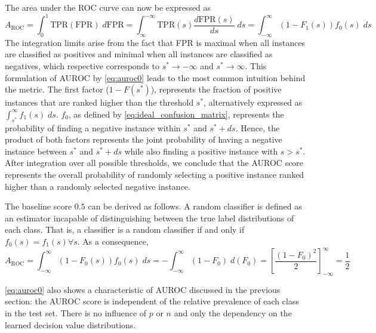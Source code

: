The area under the ROC curve can now be expressed as
%
\begin{equation}
    A_\text{ROC}
    = \int_{0}^{1} \text{TPR}(\text{FPR}) \;d\text{FPR}
    = \int_{\infty}^{-\infty} \text{TPR}(s) \frac{d\text{FPR}(s)}{ds} \;ds
    = \int_{-\infty}^{\infty} (1 - F_1(s)) f_0(s) \;ds
    \label{eq:auroc0}
\end{equation}
%
The integration limits arise from the fact that FPR is maximal when all instances are classified as positives
and minimal when all instances are classified as negatives, which respective corresponds to $s^* \to -\infty$ and $s^* \to \infty$. This formulation of AUROC by \autoref{eq:auroc0} leads to the most common intuition behind the metric.
%
The first factor ($1- F(s^*)$), represents the fraction of positive instances that are ranked higher than the threshold $s^*$, alternatively expressed as $\int_{s^*}^{\infty}f_1(s)\; ds$. $f_0$, as defined by \autoref{eq:ideal_confusion_matrix}, represents the probability of finding a negative instance within $s^*$ and $s^* + ds$. Hence, the product of both factors represents the joint probability of having a negative instance between $s^*$ and $s^* + ds$ while also finding a positive instance with $s > s^\ast$. 
%
After integration over all possible thresholds, we conclude that the AUROC score represents the overall probability of randomly selecting a positive instance ranked higher than a randomly selected negative instance.

The baseline score $0.5$ can be derived as follows. A random classifier is defined as an estimator incapable of distinguishing between the true label distributions of each class. That is, a classifier is a random classifier if and only if $f_0(s) = f_1(s) \forall s$. As a consequence,
%
\begin{equation}
    A_\text{ROC}
    = \int_{-\infty}^{\infty} (1 - F_0(s)) f_0(s) \;ds
    = -\int_{-\infty}^{\infty} (1 - F_0) \;d(F_0)
    = \left[\frac{(1-F_0)^2}{2}\right]_{-\infty}^{\infty}
    = \frac{1}{2}
    \label{eq:auroc_random}
\end{equation}
 
\autoref{eq:auroc0} also shows a characteristic of AUROC discussed in the previous section: the AUROC score is independent of the relative prevalence of each class in the test set. There is no influence of $p$ or $n$ and only the dependency on the learned decision value distributions.
%

